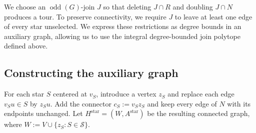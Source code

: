 \documentclass[11pt]{amsart}
\DeclareMathOperator{\odd}{odd}
\newcommand{\1}{\mathbbm{1}}
\begin{document}
We choose an $\odd(G)$-join $J$ so that deleting $J\cap R$
and doubling $J\cap N$ produces a tour. To preserve connectivity,
we require $J$ to leave at least one edge of every star unselected.
We express these restrictions as degree bounds in an auxiliary
graph, allowing us to use the integral degree-bounded join
polytope defined above.

\subsection{Constructing the auxiliary graph}
For each star $S$ centered at $v_S$, introduce a vertex $z_S$
and replace each edge $v_Su\in S$ by $z_Su$.
Add the connector $c_S:=v_Sz_S$ and keep every edge of $N$
with its endpoints unchanged. Let $H^{\mathrm{star}}=(W,A^{\mathrm{star}})$ be the resulting
connected graph, where $W:=V\cup\{z_S:S\in\mathcal S\}$.
\end{document}
